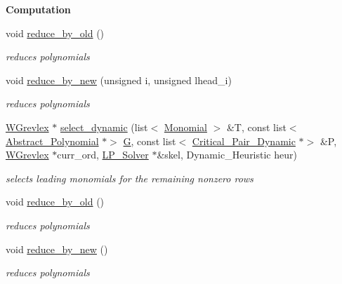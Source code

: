 \begin{Indent}\textbf{ Computation}\par
\begin{DoxyCompactItemize}
\item 
\mbox{\label{group___g_b_computation_a841c43903004e8a8e355bfcf30dfd36c}} 
void \hyperlink{group___g_b_computation_a841c43903004e8a8e355bfcf30dfd36c}{reduce\+\_\+by\+\_\+old} ()
\begin{DoxyCompactList}\small\item\em reduces polynomials \end{DoxyCompactList}\item 
\mbox{\label{group___g_b_computation_a680a5ada15ae93cdc757e802170e4b4e}} 
void \hyperlink{group___g_b_computation_a680a5ada15ae93cdc757e802170e4b4e}{reduce\+\_\+by\+\_\+new} (unsigned i, unsigned lhead\+\_\+i)
\begin{DoxyCompactList}\small\item\em reduces polynomials \end{DoxyCompactList}\item 
\hyperlink{group__orderinggroup_class_w_grevlex}{W\+Grevlex} $\ast$ \hyperlink{group___g_b_computation_a896aed2e69b7db0c0d7783bfcf7f3d03}{select\+\_\+dynamic} (list$<$ \hyperlink{group__polygroup_class_monomial}{Monomial} $>$ \&T, const list$<$ \hyperlink{group__polygroup_class_abstract___polynomial}{Abstract\+\_\+\+Polynomial} $\ast$$>$ \hyperlink{group___g_b_computation_a3dbc8c690c4a21ba195ae32c19982f79}{G}, const list$<$ \hyperlink{group___g_b_computation_class_critical___pair___dynamic}{Critical\+\_\+\+Pair\+\_\+\+Dynamic} $\ast$$>$ \&P, \hyperlink{group__orderinggroup_class_w_grevlex}{W\+Grevlex} $\ast$curr\+\_\+ord, \hyperlink{group___c_l_s_solvers_class_l_p___solvers_1_1_l_p___solver}{L\+P\+\_\+\+Solver} $\ast$\&skel, Dynamic\+\_\+\+Heuristic heur)
\begin{DoxyCompactList}\small\item\em selects leading monomials for the remaining nonzero rows \end{DoxyCompactList}\item 
\mbox{\label{group___g_b_computation_a841c43903004e8a8e355bfcf30dfd36c}} 
void \hyperlink{group___g_b_computation_a841c43903004e8a8e355bfcf30dfd36c}{reduce\+\_\+by\+\_\+old} ()
\begin{DoxyCompactList}\small\item\em reduces polynomials \end{DoxyCompactList}\item 
\mbox{\label{group___g_b_computation_a395928a83fb46aba60804c3d2b80c84a}} 
void \hyperlink{group___g_b_computation_a395928a83fb46aba60804c3d2b80c84a}{reduce\+\_\+by\+\_\+new} ()
\begin{DoxyCompactList}\small\item\em reduces polynomials \end{DoxyCompactList}\end{DoxyCompactItemize}
\end{Indent}
